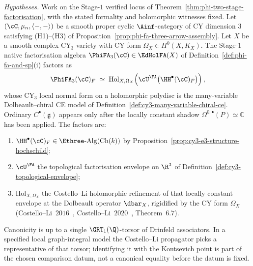 \begin{theorem}
\label{thm:cfg-factorization-envelope-stage-one}
\noindent\emph{Hypotheses.} Work on the Stage-$1$ verified locus of
Theorem~\ref{thm:phi-two-stage-factorisation}, with the stated formality
and holomorphic witnesses fixed.
Let $(\cC,\mu_n,\langle-,-\rangle)$ be a smooth proper cyclic
$\Ainf$-category of CY dimension $3$ satisfying \textup{(H1)--(H3)} of
Proposition~\ref{prop:phi-fa-three-arrow-assembly}. Let $X$ be a smooth
complex CY$_3$ variety with CY form $\Omega_X\in H^0(X,K_X)$. The
Stage-$1$ native factorisation algebra
$\PhiFA_3(\cC)\in\EdHolFA(X)$ of
Definition~\ref{def:phi-fa-and-sp}\textup{(i)} factors as
\[
\PhiFA_3(\cC)_F\;\simeq\;
\mathrm{Hol}_{X,\Omega_X}\!\left(\cU^\FA\bigl(\HH^\bullet(\cC)_F\bigr)\right),
\]
whose CY$_3$ local normal form on a holomorphic polydisc is the
many-variable Dolbeault--chiral CE model of
Definition~\ref{def:cy3-many-variable-chiral-ce}. Ordinary
$C^\bullet(\mathfrak g)$ appears only after the locally constant shadow
$\Omega^{0,\bullet}(P)\simeq\mathbb C$ has been applied.
The factors are:
\begin{enumerate}
\item $\HH^\bullet(\cC)_F\in\Ethree\text{-}\mathrm{Alg}(\mathrm{Ch}(k))$ by
Proposition~\ref{prop:cy3-e3-structure-hochschild};
\item $\cU^\FA$ the topological factorisation envelope on $\R^3$ of
Definition~\ref{def:cy3-topological-envelope};
\item $\mathrm{Hol}_{X,\Omega_X}$ the Costello--Li holomorphic
refinement of that locally constant envelope at the Dolbeault operator
$\dbar_X$, rigidified by the CY form $\Omega_X$
\textup{(Costello--Li~$2016$~\cite{CostelloLi2016},
Costello--Li~$2020$~\cite{CostelloLi2020}, Theorem~$6.7$)}.
\end{enumerate}
Canonicity is up to a single $\GRT_1(\Q)$-torsor of Drinfeld
associators. In a specified local graph-integral model the Costello--Li
propagator picks a representative of that torsor; identifying it with
the Kontsevich point is part of the chosen comparison datum, not a
canonical equality before the datum is fixed.
\end{theorem}

